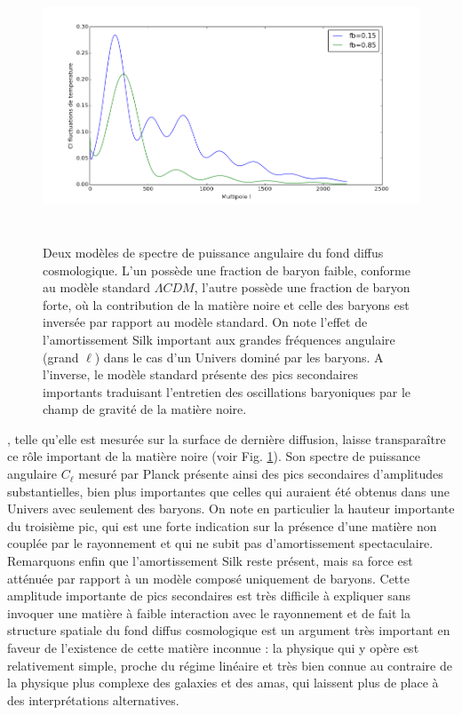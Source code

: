 \begin{figure}[htbp]
	\centering
		\includegraphics[height=8cm]{figs/cl_silk.png}
	\caption[Deux modèles de spectre de puissance angulaire du fond diffus cosmologique]{Deux modèles de spectre de puissance angulaire du fond diffus cosmologique. L'un possède une fraction de baryon faible, conforme au modèle standard $\Lambda CDM$, l'autre possède une fraction de baryon forte, où la contribution de la matière noire et celle des baryons est inversée par rapport au modèle standard. On note l'effet de l'amortissement Silk important aux grandes fréquences angulaire (grand $\ell$) dans le cas d'un Univers dominé par les baryons. A l'inverse, le modèle standard présente des pics secondaires importants traduisant l'entretien des oscillations baryoniques par le champ de gravité de la matière noire.} 
	\label{f:cl_silk}
\end{figure}

, telle qu'elle est mesurée sur la surface de dernière diffusion, laisse transparaître ce rôle important de la matière noire (voir Fig. \ref{f:cl_silk}). Son spectre de puissance angulaire $C_\ell$ mesuré par Planck présente ainsi des pics secondaires d'amplitudes substantielles, bien plus importantes que celles qui auraient été obtenus dans une Univers avec seulement des baryons. On note en particulier la hauteur importante du troisième pic, qui est une forte indication sur la présence d'une matière non couplée par le rayonnement et qui ne subit pas d'amortissement spectaculaire. Remarquons enfin que l'amortissement Silk reste présent, mais sa force est atténuée par rapport à un modèle composé uniquement de baryons. Cette amplitude importante de pics secondaires est très difficile à expliquer sans invoquer une matière à faible interaction avec le rayonnement et de fait la structure spatiale du fond diffus cosmologique est un argument très important en faveur de l'existence de cette matière inconnue : la physique qui y opère est relativement simple, proche du régime linéaire et très bien connue au contraire de la physique plus complexe des galaxies et des amas, qui laissent plus de place à des interprétations alternatives.

